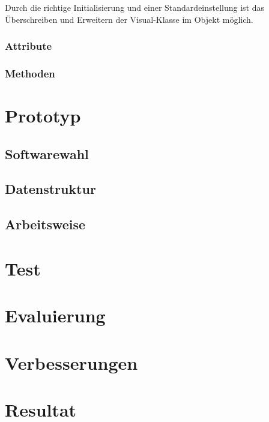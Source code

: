 Durch die richtige Initialisierung und einer Standardeinstellung ist das \"Uberschreiben und Erweitern der Visual-Klasse im
Objekt m\"oglich.

\subsubsection{Attribute}

\subsubsection{Methoden}



\section{Prototyp}

\subsection{Softwarewahl}

\subsection{Datenstruktur}

\subsection{Arbeitsweise}



\section{Test}

\section{Evaluierung}

\section{Verbesserungen}

\section{Resultat}

